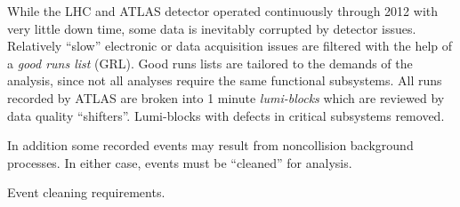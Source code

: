 While the LHC and ATLAS detector operated continuously through 2012 with very little down time, some data is inevitably corrupted by detector issues.
Relatively ``slow'' electronic or data acquisition issues are filtered with the help of a \emph{good runs list} (GRL).
Good runs lists are tailored to the demands of the analysis, since not all analyses require the same functional subsystems.
All runs recorded by ATLAS are broken into 1 minute \emph{lumi-blocks} which are reviewed by data quality ``shifters''.
Lumi-blocks with defects in critical subsystems removed.

 In addition some recorded events may result from noncollision background processes. In either case, events must be ``cleaned'' for analysis.



\begin{table}
  \begin{center}
  
  \caption[Event cleaning requirements]{Event cleaning requirements. }
  \end{center}
\end{table}
